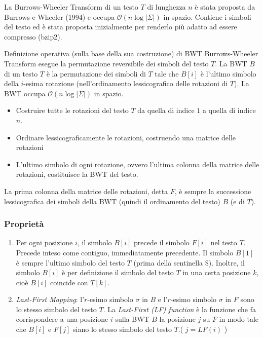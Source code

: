 La Burrows-Wheeler Transform di un testo $T$ di lunghezza $n$ è stata proposta da Burrows e Wheeler (1994) e occupa $\mathcal{O}(n \log |\Sigma|)$ in spazio.
Contiene i simboli del testo ed è stata proposta inizialmente per renderlo più adatto ad essere compresso (bzip2).
\begin{teorema}{Definizione operativa (sulla base della sua costruzione) di BWT}{}
    Burrows-Wheeler Transform esegue la permutazione reversibile dei simboli del testo $T$.
    La BWT $B$ di un testo $T$ è la permutazione dei simboli di $T$ tale che $B[i]$ è l’ultimo simbolo della $i$-esima rotazione (nell’ordinamento lessicografico delle rotazioni di $T$). La BWT occupa $\mathcal{O}(n \log |\Sigma|)$ in spazio.\\
\end{teorema}
\begin{itemize}
    \item Costruire tutte le rotazioni del testo $T$ da quella di indice $1$ a quella di indice $n$.
    \item Ordinare lessicograficamente le rotazioni, costruendo una matrice delle rotazioni
    \item L’ultimo simbolo di ogni rotazione, ovvero l’ultima colonna della matrice delle rotazioni, costituisce la BWT del testo.
\end{itemize}
La prima colonna della matrice delle rotazioni, detta $F$, è sempre la successione lessicografica dei simboli della BWT (quindi il ordinamento del testo) $B$ (e di $T$).

\subsubsection{Proprietà}
\begin{enumerate}
    \item Per ogni posizione $i$, il simbolo $B[i]$ precede il simbolo $F[i]$ nel testo $T$. Precede inteso come contiguo, immediatamente precedente. Il simbolo $B[1]$ è sempre l’ultimo simbolo del testo $T$ (prima della sentinella $\$$). Inoltre, il simbolo $B[i]$ è per definizione il simbolo del testo $T$ in una certa posizione $k$, cioè $B[i]$ coincide con $T[k]$.
    \item \textit{Last-First Mapping}: l’$r$-esimo simbolo $\sigma$ in $B$ e l’$r$-esimo simbolo $\sigma$ in $F$ sono lo stesso simbolo del testo $T$.
            La \textit{Last-First (LF) function} è la funzione che fa corrispondere a una posizione $i$ sulla BWT $B$ la posizione $j$ su $F$ in modo tale che $B[i]$ e $F[j]$ siano lo stesso simbolo del testo $T$.( $j = LF(i)$ )
\end{enumerate}

